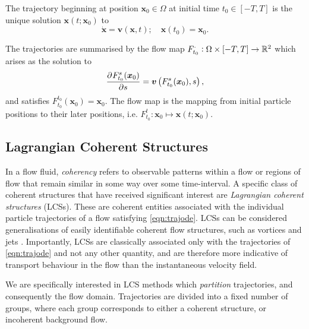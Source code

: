 \documentclass[a4paper, fontsize=12pt]{article}
\begin{document}
The trajectory beginning at position \(\bm{x}_0 \in \Omega\) at initial time \(t_0 \in [-T,T]\) is the unique solution \(\bm{x}(t; \bm{x}_0)\) to
\begin{equation}
\dot{\bm{x}} = \bm{v}(\bm{x},t); \quad \bm{x}(t_0) = \bm{x}_0.
\label{eqn:trajode}
\end{equation}

The trajectories are summarised by the flow map \(F_{t_0}^{\cdot}: \Omega \times [-T,T] \to \mathbb{R}^2\) which arises as the solution to
\begin{equation}
\dpd{F_{t_0}^{s}(\bm{x}_0)}{s} = \bm{v}\left(F_{t_0}^s(\bm{x}_0), s\right),
\label{eqn:flowmap}
\end{equation}
and satisfies \(F_{t_0}^{t_0}(\bm{x}_0) = \bm{x}_0\). The flow map is the mapping from initial particle positions to their later positions, i.e. \(F_{t_0}^{t}: \bm{x}_0 \mapsto \bm{x}(t;\bm{x}_0)\).


\subsection{Lagrangian Coherent Structures}
In a flow fluid, \textit{coherency} refers to observable patterns within a flow or regions of flow that remain similar in some way over some time-interval. A specific class of coherent structures that have received significant interest are \textit{Lagrangian coherent structures} (LCSs). These are coherent entities associated with the individual particle trajectories of a flow satisfying \eqref{eqn:trajode}. LCSs can be considered generalisations of easily identifiable coherent flow structures, such as vortices and jets \citep{balasuriya_2018_glcs}. Importantly, LCSs are classically associated only with the trajectories of \eqref{eqn:trajode} and not any other quantity, and are therefore more indicative of transport behaviour in the flow than the instantaneous velocity field.


We are specifically interested in LCS methods which \textit{partition} trajectories, and consequently the flow domain. Trajectories are divided into a fixed number of groups, where each group corresponds to either a coherent structure, or incoherent background flow. 
\end{document}
